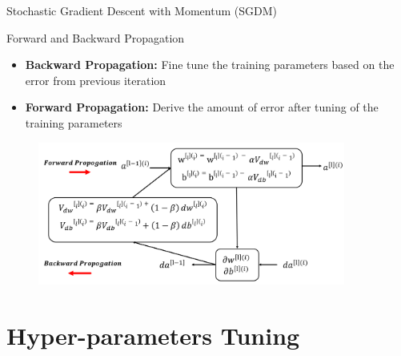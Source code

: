 \documentclass[10pt]{beamer}
\begin{document}
\begin{frame}{Stochastic Gradient Descent with Momentum (SGDM)}
    \begin{block}{Forward and Backward Propagation}
        \begin{itemize}
            \item \textbf{Backward Propagation:} Fine tune the training parameters based on the error from previous iteration
            \item \textbf{Forward Propagation:} Derive the amount of error after tuning of the training parameters 
        \end{itemize}
        \vspace{-5pt}
        \begin{figure}
             \centering
             \includegraphics[width=0.9\textwidth]{Images/propogation.png}
        \end{figure} 
    \end{block}
\end{frame}



\section{Hyper-parameters Tuning}
\end{document}
